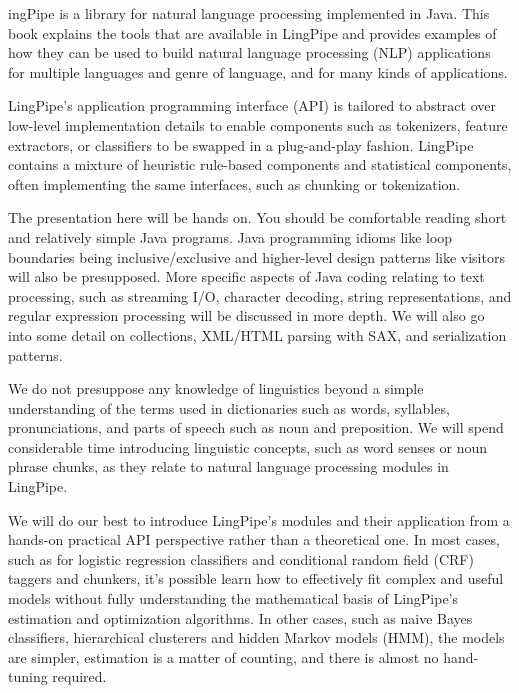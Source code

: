 \clearpage
\fancyhead{}
\fancyfoot{}
\pagestyle{fancy}


\thispagestyle{plain}

ingPipe is a library for natural language processing
implemented in Java.  This book explains the tools that are available
in LingPipe and provides examples of how they can be used to build
natural language processing (NLP) applications for multiple languages
and genre of language, and for many kinds of applications.

LingPipe's application programming interface (API) is tailored to
abstract over low-level implementation details to enable components
such as tokenizers, feature extractors, or classifiers to be swapped
in a plug-and-play fashion.  LingPipe contains a mixture of heuristic
rule-based components and statistical components, often implementing
the same interfaces, such as chunking or tokenization.

The presentation here will be hands on.  You should be comfortable
reading short and relatively simple Java programs.  Java programming idioms
like loop boundaries being inclusive/exclusive and higher-level design
patterns like visitors will also be presupposed.  More specific
aspects of Java coding relating to text processing, such as streaming
I/O, character decoding, string representations, and regular
expression processing will be discussed in more depth.  We will also
go into some detail on collections, XML/HTML parsing with SAX, and
serialization patterns.

We do not presuppose any knowledge of linguistics beyond a simple
understanding of the terms used in dictionaries such as words,
syllables, pronunciations, and parts of speech such as noun and
preposition.  We will spend considerable time introducing linguistic
concepts, such as word senses or noun phrase chunks, as they relate to
natural language processing modules in LingPipe.

We will do our best to introduce LingPipe's modules and their
application from a hands-on practical API perspective rather than a
theoretical one.  In most cases, such as for logistic regression
classifiers and conditional random field (CRF) taggers and chunkers,
it's possible learn how to effectively fit complex and useful models
without fully understanding the mathematical basis of LingPipe's
estimation and optimization algorithms.  In other cases, such as naive
Bayes classifiers, hierarchical clusterers and hidden Markov models
(HMM), the models are simpler, estimation is a matter of counting,
and there is almost no hand-tuning required.

